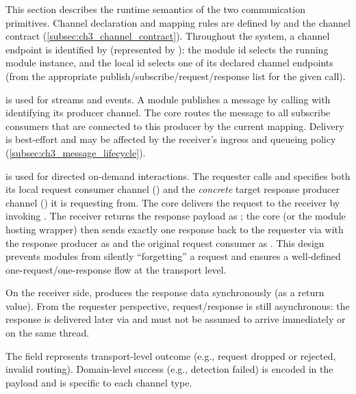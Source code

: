 This section describes the runtime semantics of the two communication primitives. Channel declaration and mapping rules are defined by  and the channel contract (\autoref{subsec:ch3_channel_contract}). Throughout the system, a channel endpoint is identified by  (represented by ): the module id selects the running module instance, and the local id selects one of its declared channel endpoints (from the appropriate publish/subscribe/request/response list for the given call).

 is used for streams and events. A module publishes a message by calling  with  identifying its producer channel. The core routes the message to all subscribe consumers that are connected to this producer by the current mapping. Delivery is best-effort and may be affected by the receiver's ingress and queueing policy (\autoref{subsec:ch3_message_lifecycle}).

 is used for directed on-demand interactions. The requester calls  and specifies both its local request consumer channel () and the \emph{concrete} target response producer channel () it is requesting from. The core delivers the request to the receiver by invoking . The receiver returns the response payload as ; the core (or the module hosting wrapper) then sends exactly one response back to the requester via  with the response producer as  and the original request consumer as . This design prevents modules from silently ``forgetting'' a request and ensures a well-defined one-request/one-response flow at the transport level.

 On the receiver side,  produces the response data synchronously (as a return value). From the requester perspective, request/response is still asynchronous: the response is delivered later via  and must not be assumed to arrive immediately or on the same thread.

 The field  represents transport-level outcome (e.g., request dropped or rejected, invalid routing). Domain-level success (e.g., detection failed) is encoded in the payload and is specific to each channel type.


